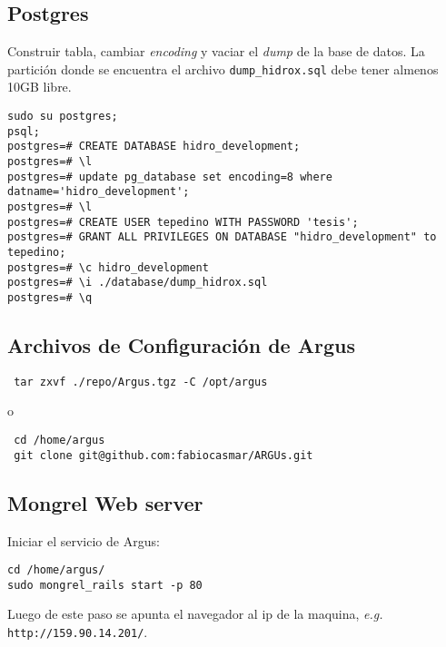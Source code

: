 \documentclass[spanish,10pt]{article}
\begin{document}
\subsection{Postgres}
Construir tabla, cambiar \emph{encoding} y vaciar el \emph{dump} de la base de datos. La partición donde se encuentra el archivo 
\verb+dump_hidrox.sql+ debe tener almenos 10GB libre.
\begin{verbatim}
sudo su postgres; 
psql;
postgres=# CREATE DATABASE hidro_development;
postgres=# \l
postgres=# update pg_database set encoding=8 where datname='hidro_development';
postgres=# \l
postgres=# CREATE USER tepedino WITH PASSWORD 'tesis';
postgres=# GRANT ALL PRIVILEGES ON DATABASE "hidro_development" to tepedino;
postgres=# \c hidro_development
postgres=# \i ./database/dump_hidrox.sql
postgres=# \q
\end{verbatim}
\subsection{Archivos de Configuración de Argus}
\begin{verbatim}
 tar zxvf ./repo/Argus.tgz -C /opt/argus
\end{verbatim}
o
\begin{verbatim}
 cd /home/argus
 git clone git@github.com:fabiocasmar/ARGUs.git
\end{verbatim}
\subsection{Mongrel Web server}
Iniciar el servicio de Argus: 
\begin{verbatim}
cd /home/argus/
sudo mongrel_rails start -p 80
\end{verbatim}
Luego de este paso se apunta el navegador al ip de la maquina, \emph{e.g.} \texttt{http://159.90.14.201/}.
\end{document}
